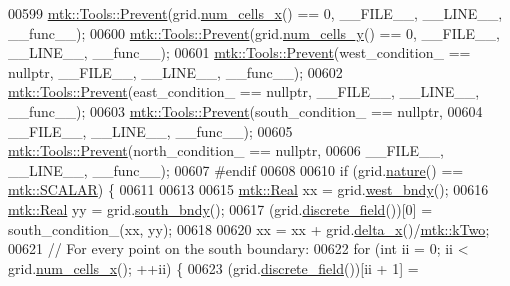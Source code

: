 \begin{DoxyCode}
00599   \hyperlink{classmtk_1_1Tools_a332324c6f25e66be9dff48c5987a3b9f}{mtk::Tools::Prevent}(grid.\hyperlink{classmtk_1_1UniStgGrid2D_a2d182866a398aba8e4829590e85bf939}{num\_cells\_x}() == 0, \_\_FILE\_\_, \_\_LINE\_\_, \_\_func\_\_);
00600   \hyperlink{classmtk_1_1Tools_a332324c6f25e66be9dff48c5987a3b9f}{mtk::Tools::Prevent}(grid.\hyperlink{classmtk_1_1UniStgGrid2D_aed05a801cc9a76dba0ff203cea58a61a}{num\_cells\_y}() == 0, \_\_FILE\_\_, \_\_LINE\_\_, \_\_func\_\_);
00601   \hyperlink{classmtk_1_1Tools_a332324c6f25e66be9dff48c5987a3b9f}{mtk::Tools::Prevent}(west\_condition\_ == \textcolor{keyword}{nullptr}, \_\_FILE\_\_, \_\_LINE\_\_, \_\_func\_\_);
00602   \hyperlink{classmtk_1_1Tools_a332324c6f25e66be9dff48c5987a3b9f}{mtk::Tools::Prevent}(east\_condition\_ == \textcolor{keyword}{nullptr}, \_\_FILE\_\_, \_\_LINE\_\_, \_\_func\_\_);
00603   \hyperlink{classmtk_1_1Tools_a332324c6f25e66be9dff48c5987a3b9f}{mtk::Tools::Prevent}(south\_condition\_ == \textcolor{keyword}{nullptr},
00604                       \_\_FILE\_\_, \_\_LINE\_\_, \_\_func\_\_);
00605   \hyperlink{classmtk_1_1Tools_a332324c6f25e66be9dff48c5987a3b9f}{mtk::Tools::Prevent}(north\_condition\_ == \textcolor{keyword}{nullptr},
00606                       \_\_FILE\_\_, \_\_LINE\_\_, \_\_func\_\_);
00607 \textcolor{preprocessor}{  #endif}
00608 
00610   \textcolor{keywordflow}{if} (grid.\hyperlink{classmtk_1_1UniStgGrid2D_a99a3a9cdb05b7306be99bde935509e30}{nature}() == \hyperlink{namespacemtk_ga4c54f2a329cfb4e56213b02a259d19e2af481d45bd70d41381c7d72e200889205}{mtk::SCALAR}) \{
00611 
00613 
00615     \hyperlink{group__c01-roots_gac080bbbf5cbb5502c9f00405f894857d}{mtk::Real} xx = grid.\hyperlink{classmtk_1_1UniStgGrid2D_af2b1712387ded85edaf2b64617d3fc13}{west\_bndy}();
00616     \hyperlink{group__c01-roots_gac080bbbf5cbb5502c9f00405f894857d}{mtk::Real} yy = grid.\hyperlink{classmtk_1_1UniStgGrid2D_a1442eaf219f099d0ebf46a170fdebf92}{south\_bndy}();
00617     (grid.\hyperlink{classmtk_1_1UniStgGrid2D_a3e72d59843a3f9c5e47da07e5850dfe0}{discrete\_field}())[0] = south\_condition\_(xx, yy);
00618 
00620     xx = xx + grid.\hyperlink{classmtk_1_1UniStgGrid2D_aca4710004c4a7da6a9e8fd6ab32a691f}{delta\_x}()/\hyperlink{group__c01-roots_gaf39c2d851a2db744f4feb1c5ab3ec2cf}{mtk::kTwo};
00621     \textcolor{comment}{// For every point on the south boundary:}
00622     \textcolor{keywordflow}{for} (\textcolor{keywordtype}{int} ii = 0; ii < grid.\hyperlink{classmtk_1_1UniStgGrid2D_a2d182866a398aba8e4829590e85bf939}{num\_cells\_x}(); ++ii) \{
00623       (grid.\hyperlink{classmtk_1_1UniStgGrid2D_a3e72d59843a3f9c5e47da07e5850dfe0}{discrete\_field}())[ii + 1] =

\end{DoxyCode}
